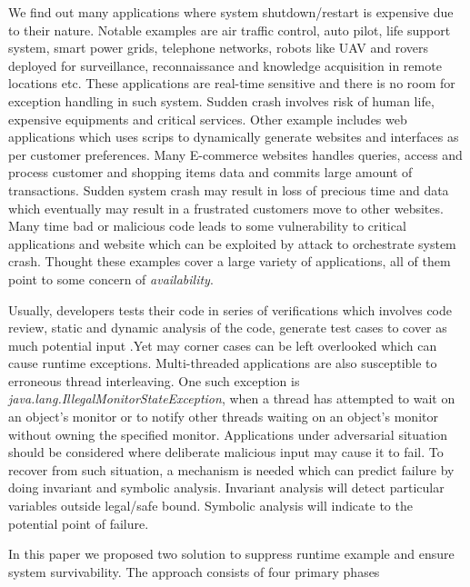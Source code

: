 \documentclass{sigplanconf}
\begin{document}
We find out many applications where system shutdown/restart is expensive due to their nature. 
Notable examples are air traffic control, auto pilot, life support system, smart power grids, telephone networks, 
robots like UAV and rovers deployed for surveillance, reconnaissance and knowledge acquisition in remote locations etc. 
These applications are real-time sensitive and there is no room for exception handling in such system. 
Sudden crash involves risk of human life, expensive equipments and critical services. 
Other example includes web applications which uses scrips to dynamically generate websites and interfaces as per customer preferences. 
Many E-commerce websites handles queries, access and process customer and shopping items data and commits large amount of transactions. 
Sudden system crash may result in loss of precious time and data which eventually may result in a frustrated customers move to other websites. 
Many time bad or malicious code leads to some vulnerability to critical applications and website which can be exploited by attack to orchestrate 
system crash. Thought these examples cover a large variety of applications, all of them point to some concern of \emph{availability}.

Usually, developers tests their code in series of verifications which involves code review, static and dynamic analysis of the code, 
generate test cases to cover as much potential input .Yet may corner cases can be left overlooked which can cause runtime exceptions. 
Multi-threaded applications are also susceptible to erroneous thread
interleaving. One such exception is
\emph{java.lang.IllegalMonitorStateException}, when a thread has attempted to
wait on an object's monitor or to notify other threads waiting on an object's
monitor without owning the specified monitor. Applications under adversarial
situation should be considered where deliberate malicious input may cause it to
fail. To recover from such situation, a mechanism is needed which can predict
failure by doing invariant and symbolic analysis. Invariant analysis will detect
particular variables outside legal/safe bound. Symbolic analysis will indicate
to the potential point of failure.


In this paper we proposed two solution to suppress runtime example and ensure system survivability. The approach consists of four primary phases
\end{document}
